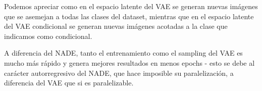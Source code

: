 \documentclass[11pt]{article}
\begin{document}
Podemos apreciar como en el espacio latente del VAE se generan nuevas imágenes que se asemejan a todas las clases del dataset, mientras que en el espacio latente del VAE condicional se generan nuevas imágenes acotadas a la clase que indicamos como condicional.

A diferencia del NADE, tanto el entrenamiento como el sampling del VAE es mucho más rápido y genera mejores resultados en menos epochs - esto se debe al carácter autorregresivo del NADE, que hace imposible su paralelización, a diferencia del VAE que si es paralelizable.
\newpage



\end{document}
